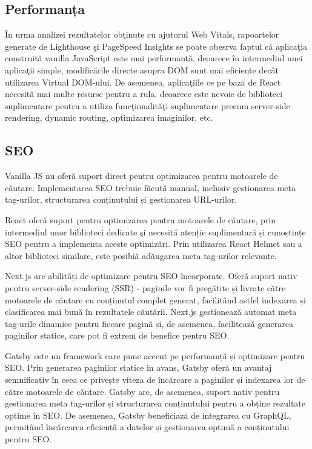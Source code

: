 \documentclass[12pt, a4paper]{report}
\begin{document}
\subsection{Performanța}

\^In urma analizei rezultatelor ob\c tinute cu ajutorul Web Vitals, rapoartelor generate de Lighthouse \c si PageSpeed Insights se poate obesrva faptul c\u a aplica\c tia construit\u a vanilla JavaScript este mai performant\u a, deoarece \^in intermediul unei aplica\c tii simple, modific\u arile directe asupra DOM sunt mai eficiente dec\^at utilizarea Virtual DOM-ului. De asemenea, aplica\c tiile ce pe baz\u a de React necesit\u a mai multe resurse pentru a rula, deoarece este nevoie de biblioteci suplimentare pentru a utiliza func\c tionalit\u a\c ti suplimentare precum server-side rendering, dynamic routing, optimizarea imaginilor, etc.

\subsection{SEO}

Vanilla JS nu oferă suport direct pentru optimizarea pentru motoarele de căutare. Implementarea SEO trebuie făcută manual, inclusiv gestionarea meta tag-urilor, structurarea conținutului și gestionarea URL-urilor.

React oferă suport pentru optimizarea pentru motoarele de căutare, prin intermediul unor biblioteci dedicate \c si necesită atenție suplimentară și cunoștințe SEO pentru a implementa aceste optimizări. Prin utilizarea React Helmet sau a altor biblioteci similare, este posibi\u a adăugarea meta tag-urilor relevante.

Next.js are abilități de optimizare pentru SEO încorporate. Oferă suport nativ pentru server-side rendering (SSR) - paginile vor fi pregătite și livrate către motoarele de căutare cu conținutul complet generat, facilitând astfel indexarea și clasificarea mai bună în rezultatele căutării. Next.js gestionează automat meta tag-urile dinamice pentru fiecare pagină și, de asemenea, facilitează generarea paginilor statice, care pot fi extrem de benefice pentru SEO.

Gatsby este un framework care pune accent pe performanță și optimizare pentru SEO. Prin generarea paginilor statice în avans, Gatsby oferă un avantaj semnificativ în ceea ce privește viteza de încărcare a paginilor și indexarea lor de către motoarele de căutare. Gatsby are, de asemenea, suport nativ pentru gestionarea meta tag-urilor și structurarea conținutului pentru a obține rezultate optime în SEO. De asemenea, Gatsby beneficiază de integrarea cu GraphQL, permițând încărcarea eficientă a datelor și gestionarea optimă a conținutului pentru SEO.
\end{document}
